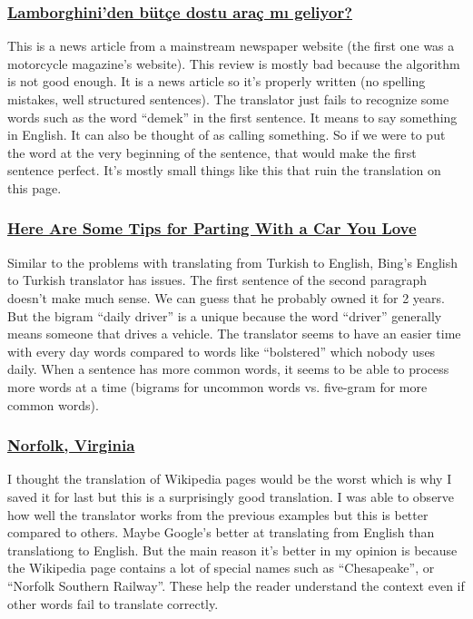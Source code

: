 \documentclass[10pt,letterpaper,bibliography=totoc]{scrartcl}
\begin{document}
\subsubsection{\href{http://www.hurriyet.com.tr/lamborghiniden-butce-dostu-arac-mi-geliyor-40346732}{Lamborghini'den bütçe dostu araç mı geliyor?}}
This is a news article from a mainstream newspaper website (the first one was a motorcycle magazine's website). This review is mostly bad because the algorithm is not good enough. It is a news article so it's properly written (no spelling mistakes, well structured sentences). The translator just fails to recognize some words such as the word ``demek'' in the first sentence. It means to say something in English. It can also be thought of as calling something. So if we were to put the word at the very beginning of the sentence, that would make the first sentence perfect. It's mostly small things like this that ruin the translation on this page. 

\subsubsection{\href{https://www.autotrader.com/car-news/here-are-some-tips-for-parting-with-a-car-you-love-270569}{Here Are Some Tips for Parting With a Car You Love}}
Similar to the problems with translating from Turkish to English, Bing's English to Turkish translator has issues. The first sentence of the second paragraph doesn't make much sense. We can guess that he probably owned it for 2 years. But the bigram ``daily driver'' is a unique because the word ``driver'' generally means someone that drives a vehicle. The translator seems to have an easier time with every day words compared to words like ``bolstered'' which nobody uses daily. When a sentence has more common words, it seems to be able to process more words at a time (bigrams for uncommon words vs. five-gram for more common words). 

\subsubsection{\href{https://en.wikipedia.org/wiki/Norfolk,_Virginia}{Norfolk, Virginia}}
I thought the translation of Wikipedia pages would be the worst which is why I saved it for last but this is a surprisingly good translation. I was able to observe how well the translator works from the previous examples but this is better compared to others. Maybe Google's better at translating from English than translationg to English. But the main reason it's better in my opinion is because the Wikipedia page contains a lot of special names such as ``Chesapeake'', or ``Norfolk Southern Railway''. These help the reader understand the context even if other words fail to translate correctly.
\end{document}
